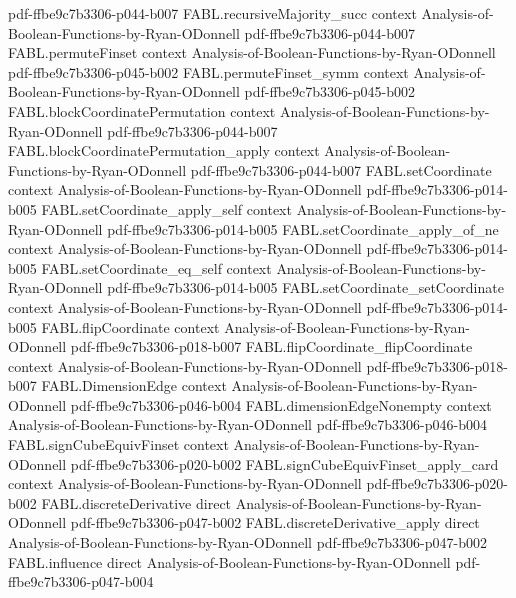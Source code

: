\begin{theorem}
  {pdf-ffbe9c7b3306-p044-b007}
\proofstep
  {FABL.recursiveMajority_succ}
  {context}
  {Analysis-of-Boolean-Functions-by-Ryan-ODonnell}
  {pdf-ffbe9c7b3306-p044-b007}
\proofstep
  {FABL.permuteFinset}
  {context}
  {Analysis-of-Boolean-Functions-by-Ryan-ODonnell}
  {pdf-ffbe9c7b3306-p045-b002}
\proofstep
  {FABL.permuteFinset_symm}
  {context}
  {Analysis-of-Boolean-Functions-by-Ryan-ODonnell}
  {pdf-ffbe9c7b3306-p045-b002}
\proofstep
  {FABL.blockCoordinatePermutation}
  {context}
  {Analysis-of-Boolean-Functions-by-Ryan-ODonnell}
  {pdf-ffbe9c7b3306-p044-b007}
\proofstep
  {FABL.blockCoordinatePermutation_apply}
  {context}
  {Analysis-of-Boolean-Functions-by-Ryan-ODonnell}
  {pdf-ffbe9c7b3306-p044-b007}
\proofstep
  {FABL.setCoordinate}
  {context}
  {Analysis-of-Boolean-Functions-by-Ryan-ODonnell}
  {pdf-ffbe9c7b3306-p014-b005}
\proofstep
  {FABL.setCoordinate_apply_self}
  {context}
  {Analysis-of-Boolean-Functions-by-Ryan-ODonnell}
  {pdf-ffbe9c7b3306-p014-b005}
\proofstep
  {FABL.setCoordinate_apply_of_ne}
  {context}
  {Analysis-of-Boolean-Functions-by-Ryan-ODonnell}
  {pdf-ffbe9c7b3306-p014-b005}
\proofstep
  {FABL.setCoordinate_eq_self}
  {context}
  {Analysis-of-Boolean-Functions-by-Ryan-ODonnell}
  {pdf-ffbe9c7b3306-p014-b005}
\proofstep
  {FABL.setCoordinate_setCoordinate}
  {context}
  {Analysis-of-Boolean-Functions-by-Ryan-ODonnell}
  {pdf-ffbe9c7b3306-p014-b005}
\proofstep
  {FABL.flipCoordinate}
  {context}
  {Analysis-of-Boolean-Functions-by-Ryan-ODonnell}
  {pdf-ffbe9c7b3306-p018-b007}
\proofstep
  {FABL.flipCoordinate_flipCoordinate}
  {context}
  {Analysis-of-Boolean-Functions-by-Ryan-ODonnell}
  {pdf-ffbe9c7b3306-p018-b007}
\proofstep
  {FABL.DimensionEdge}
  {context}
  {Analysis-of-Boolean-Functions-by-Ryan-ODonnell}
  {pdf-ffbe9c7b3306-p046-b004}
\proofstep
  {FABL.dimensionEdgeNonempty}
  {context}
  {Analysis-of-Boolean-Functions-by-Ryan-ODonnell}
  {pdf-ffbe9c7b3306-p046-b004}
\proofstep
  {FABL.signCubeEquivFinset}
  {context}
  {Analysis-of-Boolean-Functions-by-Ryan-ODonnell}
  {pdf-ffbe9c7b3306-p020-b002}
\proofstep
  {FABL.signCubeEquivFinset_apply_card}
  {context}
  {Analysis-of-Boolean-Functions-by-Ryan-ODonnell}
  {pdf-ffbe9c7b3306-p020-b002}
\proofstep
  {FABL.discreteDerivative}
  {direct}
  {Analysis-of-Boolean-Functions-by-Ryan-ODonnell}
  {pdf-ffbe9c7b3306-p047-b002}
\proofstep
  {FABL.discreteDerivative_apply}
  {direct}
  {Analysis-of-Boolean-Functions-by-Ryan-ODonnell}
  {pdf-ffbe9c7b3306-p047-b002}
\proofstep
  {FABL.influence}
  {direct}
  {Analysis-of-Boolean-Functions-by-Ryan-ODonnell}
  {pdf-ffbe9c7b3306-p047-b004}

\end{theorem}
